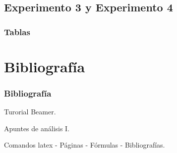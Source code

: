 \documentclass{beamer}
\begin{document}
\subsection{Experimento 3 y Experimento 4}
\begin{frame}
\frametitle{Tablas}



\end{frame}
\section{Bibliografía}
\begin{frame}
  \frametitle{Bibliografía}

  \begin{thebibliography}{10}

    \beamertemplatebookbibitems
    Turorial Beamer. 

    \beamertemplatebookbibitems
    Apuntes de análisis I.
    
    \beamertemplatebookbibitems
    Comandos latex - Páginas - Fórmulas - Bibliografías. 

   

  \end{thebibliography}
\end{frame}

\end{document}
